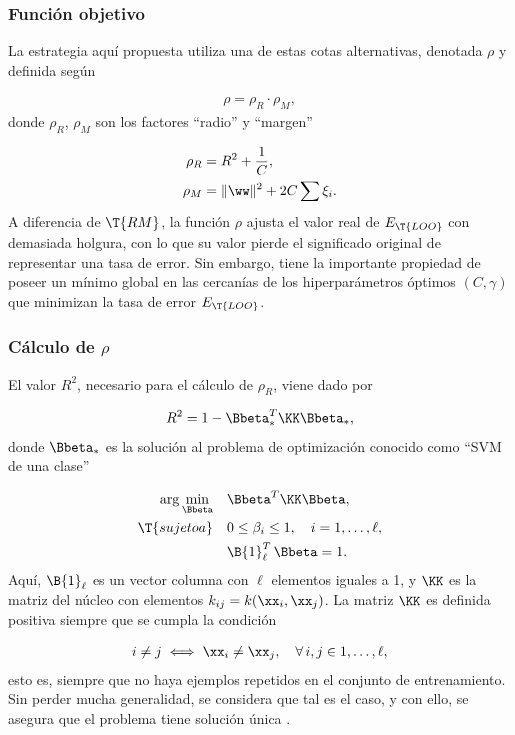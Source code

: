 \subsubsection{Función objetivo}
La estrategia aquí propuesta utiliza una de estas cotas
alternativas, denotada $\rho$ y definida según

\begin{align}
  \rho = \rho_R \cdot \rho_M,
\end{align}
donde $\rho_R$, $\rho_M$ son los factores ``radio'' y ``margen''

\begin{align}
  \rho_R &= R^2+\frac{1}{C}, \\
  \rho_M &= \|\ww\|^2+2C\sum\xi_i.
\end{align}
A diferencia de $\T{RM}$, la función $\rho$ ajusta el valor
real de $E_{\T{LOO}}$ con demasiada holgura, con lo que su valor
pierde el significado original de representar una tasa de error. Sin
embargo, tiene la importante propiedad de poseer un mínimo global en
las cercanías de los hiperparámetros óptimos $(C,\gamma)$ que
minimizan la tasa de error $E_{\T{LOO}}$.

\subsubsection{Cálculo de $\rho$}
El valor $R^2$, necesario para el cálculo de $\rho_R$, viene dado por

\begin{align}
  R^2 = 1 - \Bbeta_*^T \KK \Bbeta_*,
\end{align}
donde $\Bbeta_*$ es la solución al problema de optimización conocido
como ``SVM de una clase'' \cite{scholkopf}

\begin{align}
\begin{split}
  \arg\min_{\Bbeta}\quad&\Bbeta^T \KK \Bbeta,\\
  \T{sujeto a}    \quad&0\leq\beta_i\leq{}1,\quad{}i=1,\ldots,\ell,\\
                       &\B{1}^T_\ell\,\Bbeta=1.
  \end{split}
  \label{svm-oneclass}
\end{align}
Aquí, $\B{1}_{\ell}$ es un vector columna con $\ell$ elementos iguales
a 1, y $\KK$ es la matriz del núcleo con elementos
$k_{ij}=k(\xx_i,\xx_j)$. La matriz $\KK$ es definida positiva siempre
que se cumpla la condición

\begin{align}
\label{cond-kmatrix-defpos}
  i\neq j \iff \xx_i\neq\xx_j,\quad \forall\,i,j\in{1,\ldots,\ell},
\end{align}
esto es, siempre que no haya ejemplos repetidos en el conjunto de
entrenamiento. Sin perder mucha generalidad, se considera que tal es
el caso, y con ello, se asegura que el problema \cite{svm-oneclass}
tiene solución única \cite{SOL-UNICA-DEFINIDA-POSITIVA}.

